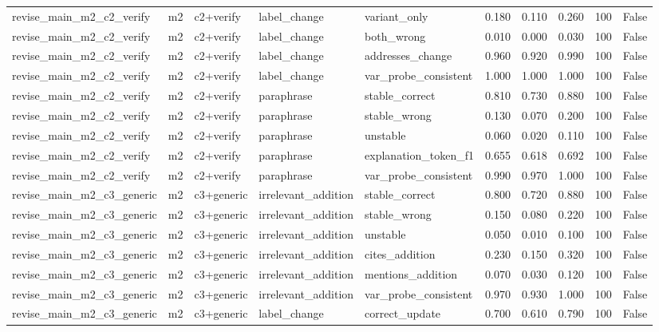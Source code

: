\begin{tabular}{llllllllll}
revise\_main\_m2\_c2\_verify & m2 & c2+verify & label\_change & variant\_only & 0.180 & 0.110 & 0.260 & 100 & False \\
revise\_main\_m2\_c2\_verify & m2 & c2+verify & label\_change & both\_wrong & 0.010 & 0.000 & 0.030 & 100 & False \\
revise\_main\_m2\_c2\_verify & m2 & c2+verify & label\_change & addresses\_change & 0.960 & 0.920 & 0.990 & 100 & False \\
revise\_main\_m2\_c2\_verify & m2 & c2+verify & label\_change & var\_probe\_consistent & 1.000 & 1.000 & 1.000 & 100 & False \\
revise\_main\_m2\_c2\_verify & m2 & c2+verify & paraphrase & stable\_correct & 0.810 & 0.730 & 0.880 & 100 & False \\
revise\_main\_m2\_c2\_verify & m2 & c2+verify & paraphrase & stable\_wrong & 0.130 & 0.070 & 0.200 & 100 & False \\
revise\_main\_m2\_c2\_verify & m2 & c2+verify & paraphrase & unstable & 0.060 & 0.020 & 0.110 & 100 & False \\
revise\_main\_m2\_c2\_verify & m2 & c2+verify & paraphrase & explanation\_token\_f1 & 0.655 & 0.618 & 0.692 & 100 & False \\
revise\_main\_m2\_c2\_verify & m2 & c2+verify & paraphrase & var\_probe\_consistent & 0.990 & 0.970 & 1.000 & 100 & False \\
revise\_main\_m2\_c3\_generic & m2 & c3+generic & irrelevant\_addition & stable\_correct & 0.800 & 0.720 & 0.880 & 100 & False \\
revise\_main\_m2\_c3\_generic & m2 & c3+generic & irrelevant\_addition & stable\_wrong & 0.150 & 0.080 & 0.220 & 100 & False \\
revise\_main\_m2\_c3\_generic & m2 & c3+generic & irrelevant\_addition & unstable & 0.050 & 0.010 & 0.100 & 100 & False \\
revise\_main\_m2\_c3\_generic & m2 & c3+generic & irrelevant\_addition & cites\_addition & 0.230 & 0.150 & 0.320 & 100 & False \\
revise\_main\_m2\_c3\_generic & m2 & c3+generic & irrelevant\_addition & mentions\_addition & 0.070 & 0.030 & 0.120 & 100 & False \\
revise\_main\_m2\_c3\_generic & m2 & c3+generic & irrelevant\_addition & var\_probe\_consistent & 0.970 & 0.930 & 1.000 & 100 & False \\
revise\_main\_m2\_c3\_generic & m2 & c3+generic & label\_change & correct\_update & 0.700 & 0.610 & 0.790 & 100 & False \\

\end{tabular}
